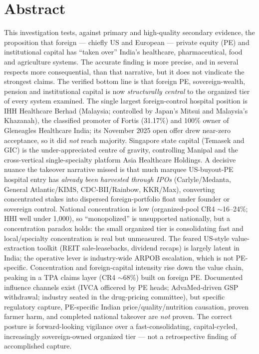 \documentclass[11pt,a4paper]{article}
\begin{document}
\section*{Abstract}
This investigation tests, against primary and high-quality secondary evidence, the proposition that foreign --- chiefly US and European --- private equity (PE) and institutional capital has ``taken over'' India's healthcare, pharmaceutical, food and agriculture systems. The accurate finding is more precise, and in several respects more consequential, than that narrative, but it does not vindicate the strongest claims. The verified bottom line is that foreign PE, sovereign-wealth, pension and institutional capital is now \emph{structurally central} to the organized tier of every system examined. The single largest foreign-control hospital position is IHH Healthcare Berhad (Malaysia; controlled by Japan's Mitsui and Malaysia's Khazanah), the classified promoter of Fortis (31.17\%) and 100\% owner of Gleneagles Healthcare India; its November 2025 open offer drew near-zero acceptance, so it did \emph{not} reach majority. Singapore state capital (Temasek and GIC) is the under-appreciated centre of gravity, controlling Manipal and the cross-vertical single-specialty platform Asia Healthcare Holdings. A decisive nuance the takeover narrative missed is that much marquee US-buyout-PE hospital entry has \emph{already been harvested through IPOs} (Carlyle/Medanta, General Atlantic/KIMS, CDC-BII/Rainbow, KKR/Max), converting concentrated stakes into dispersed foreign-portfolio float under founder or sovereign control. National concentration is low (organized-pool CR4 $\sim$16--24\%; HHI well under 1{,}000), so ``monopolized'' is unsupported nationally, but a concentration paradox holds: the small organized tier is consolidating fast and local/specialty concentration is real but unmeasured. The feared US-style value-extraction toolkit (REIT sale-leasebacks, dividend recaps) is largely latent in India; the operative lever is industry-wide ARPOB escalation, which is not PE-specific. Concentration and foreign-capital intensity rise down the value chain, peaking in a TPA claims layer (CR4 $\sim$68\%) built on foreign PE. Documented influence channels exist (IVCA officered by PE heads; AdvaMed-driven GSP withdrawal; industry seated in the drug-pricing committee), but specific regulatory capture, PE-specific Indian price/quality/nutrition causation, proven farmer harm, and completed national takeover are \emph{not} proven. The correct posture is forward-looking vigilance over a fast-consolidating, capital-cycled, increasingly sovereign-owned organized tier --- not a retrospective finding of accomplished capture.
\end{document}
